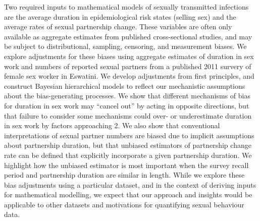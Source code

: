 Two required inputs to mathematical models of sexually transmitted infections are
the average duration in epidemiological risk states (\eg selling sex) and
the average rates of sexual partnership change.
These variables are often only available as aggregate estimates from
published cross-sectional studies, and may be subject to
distributional, sampling, censoring, and measurement biases.
We explore adjustments for these biases using aggregate estimates of
duration in sex work and numbers of reported sexual partners
from a published 2011 survery of female sex worker in Eswatini.
We develop adjustments from first principles,
and construct Bayesian hierarchical models to reflect
our mechanistic assumptions about the bias-generating processes.
We show that different mechanisms of bias for duration in sex work may
``cancel out'' by acting in opposite directions,
but that failure to consider some mechanisms could over- or underestimate
duration in sex work by factors approaching 2.
We also show that conventional interpretations of sexual partner numbers
are biased due to implicit assumptions about partnership duration,
but that unbiased estimators of partnership change rate can be defined
that explicitly incorporate a given partnership duration.
We highlight how the unbiased estimator is most important when
the survey recall period and partnership duration are similar in length.
While we explore these bias adjustments using a particular dataset,
and in the context of deriving inputs for mathematical modelling,
we expect that our approach and insights would be applicable to
other datasets and motivations for quantifying sexual behaviour data.

